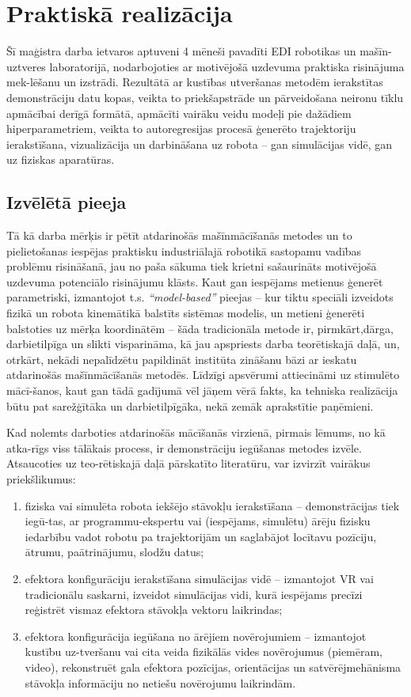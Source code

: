 \documentclass[12pt, a4paper]{article}
\numberwithin{equation}{section} %
\begin{document}
\newpage
\section{Praktiskā realizācija}

Šī maģistra darba ietvaros aptuveni 4 mēneši pavadīti EDI robotikas un mašīn-uztveres laboratorijā, nodarbojoties ar motivējošā uzdevuma praktiska risinājuma mek-lēšanu un izstrādi. Rezultātā ar kustības utveršanas metodēm ierakstītas demonstrāciju datu kopas, veikta to priekšapstrāde un pārveidošana neironu tīklu apmācībai derīgā formātā, apmācīti vairāku veidu modeļi pie dažādiem hiperparametriem, veikta to autoregresijas procesā ģenerēto trajektoriju ierakstīšana, vizualizācija un darbināšana uz robota -- gan simulācijas vidē, gan uz fiziskas aparatūras.

\subsection{Izvēlētā pieeja}

Tā kā darba mērķis ir pētīt atdarinošās mašīnmācīšanās metodes un to pielietošanas iespējas praktisku industriālajā robotikā sastopamu vadības problēmu risināšanā, jau no paša sākuma tiek krietni sašaurināts motivējošā uzdevuma potenciālo risinājumu klāsts. Kaut gan iespējams metienus ģenerēt parametriski, izmantojot t.s. \textit{``model-based''} pieejas -- kur tiktu speciāli izveidots fizikā un robota kinemātikā balstīts sistēmas modelis, un metieni ģenerēti balstoties uz mērķa koordinātēm -- šāda tradicionāla metode ir, pirmkārt,dārga, darbietilpīga un slikti visparināma, kā jau apspriests darba teorētiskajā daļā, un, otrkārt, nekādi nepalīdzētu papildināt institūta zināšanu bāzi ar ieskatu atdarinošās mašīnmācīšanās metodēs. Līdzīgi apsvērumi attiecināmi uz stimulēto mācī-šanos, kaut gan tādā gadījumā vēl jāņem vērā fakts, ka tehniska realizācija būtu pat sarežģītāka un darbietilpīgāka, nekā zemāk aprakstītie paņēmieni.

Kad nolemts darboties atdarinošās mācīšanās virzienā, pirmais lēmums, no kā atka-rīgs viss tālākais process, ir demonstrāciju iegūšanas metodes izvēle. Atsaucoties uz teo-rētiskajā daļā pārskatīto literatūru, var izvirzīt vairākus priekšlikumus:


\begin{enumerate}
    \item fiziska vai simulēta robota iekšējo stāvokļu ierakstīšana -- demonstrācijas tiek iegū-tas, ar programmu-ekspertu vai (iespējams, simulētu) ārēju fizisku iedarbību vadot robotu pa trajektorijām un saglabājot locītavu pozīciju, ātrumu, paātrinājumu, slodžu datus;
    \item efektora konfigurāciju ierakstīšana simulācijas vidē -- izmantojot VR vai tradicionālu saskarni, izveidot simulācijas vidi, kurā iespējams precīzi reģistrēt vismaz efektora stāvokļa vektoru laikrindas;
    \item efektora konfigurācija iegūšana no ārējiem novērojumiem -- izmantojot kustību uz-tveršanu vai cita veida fizikālās vides novērojumus (piemēram, video), rekonstruēt gala efektora pozīcijas, orientācijas un satvērējmehānisma stāvokļa informāciju no netiešu novērojumu laikrindām.
\end{enumerate}
\end{document}
